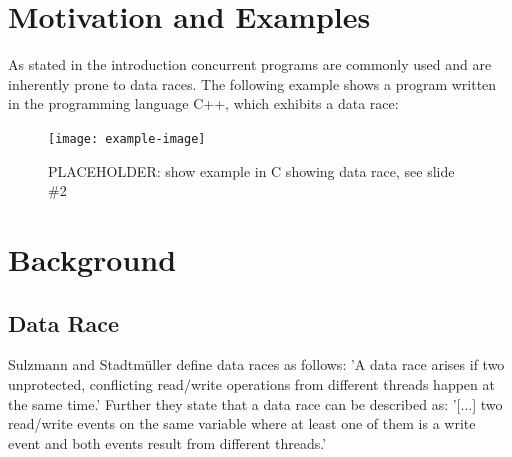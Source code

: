 \documentclass[12pt]{article}
\begin{document}

	\section{Motivation and Examples}
	As stated in the introduction concurrent programs are commonly used and are inherently prone to data races. The following example shows a program written in the programming language C++, which exhibits a data race:
	\begin{figure}[h]
		\centering
		\texttt{[image: example-image]}
		\caption{PLACEHOLDER: show example in C showing data race, see slide \#2}
		\label{data-race-ex}
	\end{figure}
	
	\section{Background}
		\subsection{Data Race}
		Sulzmann and Stadtm\"uller \cite[p. 1]{sulzmann} define data races as follows: 'A data race arises if two unprotected, conflicting read/write operations from different threads happen at the same time.' Further they state that a data race can be described as: '[...] two read/write events on the same variable where at least one of them is a write event and both events result from different threads.'
\end{document}
